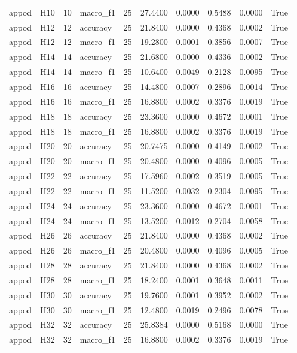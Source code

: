 \begin{table}[tbp]
\begin{tabular}{llrlrrrrrr}
appod & H10 & 10 & macro\_f1 & 25 & 27.4400 & 0.0000 & 0.5488 & 0.0000 & True \\
appod & H12 & 12 & accuracy & 25 & 21.8400 & 0.0000 & 0.4368 & 0.0002 & True \\
appod & H12 & 12 & macro\_f1 & 25 & 19.2800 & 0.0001 & 0.3856 & 0.0007 & True \\
appod & H14 & 14 & accuracy & 25 & 21.6800 & 0.0000 & 0.4336 & 0.0002 & True \\
appod & H14 & 14 & macro\_f1 & 25 & 10.6400 & 0.0049 & 0.2128 & 0.0095 & True \\
appod & H16 & 16 & accuracy & 25 & 14.4800 & 0.0007 & 0.2896 & 0.0014 & True \\
appod & H16 & 16 & macro\_f1 & 25 & 16.8800 & 0.0002 & 0.3376 & 0.0019 & True \\
appod & H18 & 18 & accuracy & 25 & 23.3600 & 0.0000 & 0.4672 & 0.0001 & True \\
appod & H18 & 18 & macro\_f1 & 25 & 16.8800 & 0.0002 & 0.3376 & 0.0019 & True \\
appod & H20 & 20 & accuracy & 25 & 20.7475 & 0.0000 & 0.4149 & 0.0002 & True \\
appod & H20 & 20 & macro\_f1 & 25 & 20.4800 & 0.0000 & 0.4096 & 0.0005 & True \\
appod & H22 & 22 & accuracy & 25 & 17.5960 & 0.0002 & 0.3519 & 0.0005 & True \\
appod & H22 & 22 & macro\_f1 & 25 & 11.5200 & 0.0032 & 0.2304 & 0.0095 & True \\
appod & H24 & 24 & accuracy & 25 & 23.3600 & 0.0000 & 0.4672 & 0.0001 & True \\
appod & H24 & 24 & macro\_f1 & 25 & 13.5200 & 0.0012 & 0.2704 & 0.0058 & True \\
appod & H26 & 26 & accuracy & 25 & 21.8400 & 0.0000 & 0.4368 & 0.0002 & True \\
appod & H26 & 26 & macro\_f1 & 25 & 20.4800 & 0.0000 & 0.4096 & 0.0005 & True \\
appod & H28 & 28 & accuracy & 25 & 21.8400 & 0.0000 & 0.4368 & 0.0002 & True \\
appod & H28 & 28 & macro\_f1 & 25 & 18.2400 & 0.0001 & 0.3648 & 0.0011 & True \\
appod & H30 & 30 & accuracy & 25 & 19.7600 & 0.0001 & 0.3952 & 0.0002 & True \\
appod & H30 & 30 & macro\_f1 & 25 & 12.4800 & 0.0019 & 0.2496 & 0.0078 & True \\
appod & H32 & 32 & accuracy & 25 & 25.8384 & 0.0000 & 0.5168 & 0.0000 & True \\
appod & H32 & 32 & macro\_f1 & 25 & 16.8800 & 0.0002 & 0.3376 & 0.0019 & True \\
\bottomrule
\end{tabular}
\end{table}
